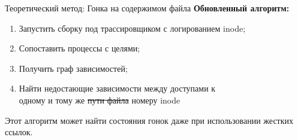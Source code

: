     \begin{frame}[label=current]{Теоретический метод: Гонка на содержимом файла}
        \textbf{Обновленный алгоритм:}

        \begin{enumerate}
            \item Запустить сборку под трассировщиком с логированием inode;
            \item Сопоставить процессы с целями;
            \item Получить граф зависимостей;
            \item Найти недостающие зависимости между доступами к \\ одному и тому же \colorbox{diffrem}{\sout{\vphantom{fp}пути файла}}
            \colorbox{diffadd}{\vphantom{fp}номеру inode}
        \end{enumerate}

        Этот алгоритм может найти состояния гонок даже при использовании жестких ссылок.

    \end{frame}


